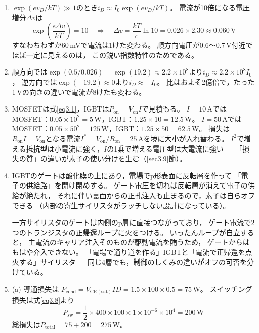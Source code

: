 \answer
\begin{enumerate}

\item[\ref{ex3.1}]
$\exp(ev_D/kT) \gg 1$のとき$i_D \approx I_0\exp(ev_D/kT)$。
電流が10倍になる電圧増分$\mathit{\Delta}v$は
\begin{equation*}
\exp\left(\frac{e\mathit{\Delta}v}{kT}\right) = 10
\quad\Rightarrow\quad
\mathit{\Delta}v = \frac{kT}{e}\ln 10 = 0.026\times2.30 \approx 0.060\,\mathrm{V}
\end{equation*}
すなわちわずか60\,mVで電流は1けた変わる。
順方向電圧が0.6〜0.7\,V付近でほぼ一定に見えるのは，
この鋭い指数特性のためである。

\item[\ref{ex3.2}]
順方向では$\exp(0.5/0.026) = \exp(19.2) \approx 2.2\times10^{8}$より$i_D \approx 2.2\times10^{8} I_0$，
逆方向では$\exp(-19.2) \approx 0$より$i_D \approx -I_0$。
比はおよそ2億倍で，たった1\,Vの向きの違いで電流が8けたも変わる。

\item[\ref{ex3.3}]
MOSFETは式\ref{eq3.1}，IGBTは$P_{\mathrm{on}} = V_{\mathrm{on}}I$で見積もる。
$I = 10$\,AではMOSFET：$0.05\times10^2 = 5$\,W，IGBT：$1.25\times10 = 12.5$\,W。
$I = 50$\,AではMOSFET：$0.05\times50^2 = 125$\,W，IGBT：$1.25\times50 = 62.5$\,W。
損失は$R_{\mathrm{on}}I = V_{\mathrm{on}}$となる電流$I^* = V_{\mathrm{on}}/R_{\mathrm{on}} = 25$\,Aを境に大小が入れ替わる。
$I^2$で増える抵抗型は小電流に強く，$I$の1乗で増える電圧型は大電流に強い ―
「損失の質」の違いが素子の使い分けを生む（\ref{sec3.9}節）。

\item[\ref{ex3.4}]
IGBTのゲートは酸化膜の上にあり，電場でp形表面に反転層を作って
「電子の供給路」を開け閉めする。
ゲート電圧を切れば反転層が消えて電子の供給が絶たれ，
それに伴い裏面からの正孔注入も止まるので，素子は自らオフできる
（内部の寄生サイリスタがラッチしない設計になっている）。

一方サイリスタのゲートは内側のp層に直接つながっており，
ゲート電流で2つのトランジスタの正帰還ループに火をつける。
いったんループが自立すると，
主電流のキャリア注入そのものが駆動電流を賄うため，
ゲートからはもはや介入できない。
「電場で通り道を作る」IGBTと「電流で正帰還を点火する」サイリスタ ―
同じ4層でも，制御のしくみの違いがオフの可否を分けている。

\item[\ref{ex3.5}]
(a) 導通損失は
$P_{\mathrm{cond}} = V_{\mathrm{CE(sat)}}ID = 1.5\times100\times0.5 = 75$\,W。
スイッチング損失は式\ref{eq3.8}より
\begin{equation*}
P_{\mathrm{sw}} = \frac{1}{2}\times400\times100\times1\times10^{-6}\times10^4 = 200\,\mathrm{W}
\end{equation*}
総損失は$P_{\mathrm{total}} = 75 + 200 = 275$\,W。


\end{enumerate}
